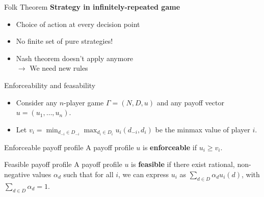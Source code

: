 
\begin{frame}{Folk Theorem}
    \textbf{Strategy in infinitely-repeated game}\\
    \begin{itemize}
        \item Choice of action at every decision point
        \item No finite set of pure strategies!
        \item Nash theorem doesn't apply anymore\\
        $\rightarrow$ We need new rules
    \end{itemize}
\end{frame}



\begin{frame}{Enforceability and feasability}
    \begin{itemize}
        \item Consider any $n$-player game $\Gamma = (N, D, u)$ and any payoff vector
        $u = (u_1, \dots, u_n)$.
        \item Let $v_i= \min_{d_{-i}\in D_{-i}} \max_{d_i\in D_i} u_i(d_{-i}, d_i)$ be
        the minmax value of player $i$.
    \end{itemize}

    \begin{block}{Enforceable payoff profile}
        A payoff profile $u$ is \textbf{enforceable} if $u_i \geq v_i$.
    \end{block}

    \begin{block}{Feasible payoff profile}
        A payoff profile $u$ is \textbf{feasible} if there exist rational, non-negative
        values $\alpha_d$ such that for all $i$, we can express $u_i$ as
        $\sum_{d\in D} \alpha_d u_i(d)$, with $\sum_{d\in D} \alpha_d = 1$.
    \end{block}
\end{frame}

